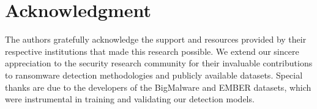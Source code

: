 \documentclass[conference]{IEEEtran}
\begin{document}
\section*{Acknowledgment}
The authors gratefully acknowledge the support and resources provided by their respective institutions that made this research possible. We extend our sincere appreciation to the security research community for their invaluable contributions to ransomware detection methodologies and publicly available datasets. Special thanks are due to the developers of the BigMalware and EMBER datasets, which were instrumental in training and validating our detection models.



\end{document}
